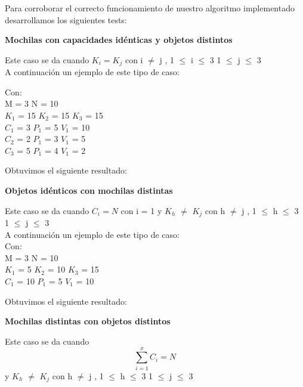 \indent Para corroborar el correcto funcionamiento de nuestro algoritmo implementado desarrollamos los siguientes tests:\\


\begin{center}
 \textbf{Mochilas con capacidades id\'enticas y objetos distintos}
\end{center}

Este caso se da cuando $K_{i} = K_{j}$ con i $\neq$ j , 1 $\leq$ i $\leq$ 3  1 $\leq$ j $\leq$ 3  \\

A continuaci\'on un ejemplo de este tipo de caso:

 Con:\\
 M = 3 N = 10\\
 $K_{1}$ = 15  $K_{2}$ = 15  $K_{3}$ = 15 \\
 $C_{1}$ = 3 $P_{1}$ = 5 $V_{1}$ = 10\\
 $C_{2}$ = 2 $P_{1}$ = 3 $V_{1}$ = 5\\
 $C_{3}$ = 5 $P_{1}$ = 4 $V_{1}$ = 2\\
  
  \indent  
  
  Obtuvimos el siguiente resultado:\\


\begin{center}
 \textbf{Objetos id\'enticos con mochilas distintas}
\end{center}

Este caso se da cuando $C_{i} = N$ con i = 1 y $K_{h}$ $\neq$ $K_{j}$ con h $\neq$ j , 1 $\leq$ h $\leq$ 3  1 $\leq$ j $\leq$ 3 \\

A continuaci\'on un ejemplo de este tipo de caso:\\

 Con:\\
 M = 3 N = 10\\
 $K_{1}$ = 5  $K_{2}$ = 10  $K_{3}$ = 15 \\
 $C_{1}$ = 10 $P_{1}$ = 5 $V_{1}$ = 10\\
  
  \indent  
  
  Obtuvimos el siguiente resultado:\\


\begin{center}
 \textbf{Mochilas distintas con objetos distintos}
\end{center}

Este caso se da cuando \[
\sum_{i=1}^{x}C_{i}=N 
\]  y $K_{h}$ $\neq$ $K_{j}$ con h $\neq$ j , 1 $\leq$ h $\leq$ 3  1 $\leq$ j $\leq$ 3 \\

